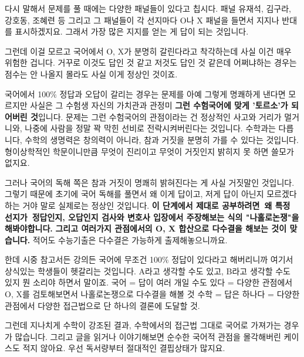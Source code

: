 다시 말해서 문제를 풀 때에는 다양한 패널들이 있다고 칩시다.
패널 유재석, 김구라, 강호동, 조혜련 등
그리고 그 패널들이 각 선지마다 O나 X 패널을 들면서 지지나 반대를 표시하겠지요.
그래서 가장 많은 지지를 얻는 게 답이 되는 것입니다.
\vspace{5mm}

그런데 이걸 모르고 국어에서 O, X가 분명히 갈린다라고 착각하는데 사실 이건 매우 위험한 겁니다.
거꾸로 이것도 답인 것 같고 저것도 답인 것 같은데 어쩌냐하는 경우는 점수는 안 나올지 몰라도 사실 이게 정상인 것이죠.
\vspace{5mm}

국어에서 100$\%$ 정답과 오답이 갈리는 경우는 문제를 아예 그렇게 명쾌하게 낸다면 모르지만
사실은 그 수험생 자신의 가치관과 관정미 \textbf{그런 수험국어에 맞게 '토르소'가 되어버린 것}입니다.
문제는 그런 수험국어의 관점이라는 건 정상적인 사고와 거리가 멀거니와, 나중에 사람을 정말 꽉 막힌 선비로 전락시켜버린다는 것입니다.
수학과는 다릅니다, 수학의 생명력은 창의력이 아니라, 참과 거짓을 분명히 가를 수 있다는 것입니다.
형이상학적인 학문이니만큼 무엇이 진리이고 무엇이 거짓인지 밝히지 못 하면 쓸모가 없지요.
\vspace{5mm}

그러나 국어의 독해 쪽은 참과 거짓이 명쾌히 밝혀진다는 게 사실 거짓말인 것입니다.
그렇기 때문에 초기에 국어 독해를 풀면서 왜 이게 답이고, 저게 답이 아닌지 모르겠다하는 거야 말로 실제로는 정상인 것입니다.
\textbf{이 단계에서 제대로 공부하려면 왜 특정 선지가 정답인지, 오답인지 검사와 변호사 입장에서 주장해보는 식의 "나홀로논쟁"을 해봐야합니다.}
\textbf{그리고 여러가지 관점에서의 O, X 합산으로 다수결을 해보는 것이 맞습니다.}
적어도 수능기출은 다수결은 가능하게 출제해놓으니까요.
\vspace{5mm}

한데 시중 참고서든 강의든 국어에 무조건 100$\%$ 정답이 있다라고 해버리니까 여기서 상식있는 학생들이 헷갈리는 것입니다.
A라고 생각할 수도 있고, B라고 생각할 수도 있지 뭔 소리야 하면서 말이죠.
국어 = 답이 여러 개일 수도 있다 = 다양한 관점에서 O, X를 검토해보면서 나홀로논쟁으로 다수결을 해볼 것
수학 = 답은 하나다 = 다양한 관점에서 다양한 접근법으로 단 하나의 결론에 도달할 것.
\vspace{5mm}

그런데 지나치게 수학이 강조된 결과, 수학에서의 접근법 그대로 국어로 가져가는 경우가 많습니다.
그리고 글을 읽거나 이야기해보면 순수한 국어적 관점을 몰각해버린 케이스도 적지 않아요. 우선 독서량부터 절대적인 결핍상태가 많지요.
\vspace{5mm}





